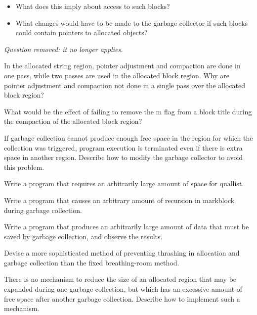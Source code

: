 \begin{itemize}
\item What does this imply about access to such blocks?

\item What changes would have to be made to the garbage collector if
such blocks could contain pointers to allocated objects?

\end{itemize}

{\em Question removed: it no longer applies.}

 In the allocated string region, pointer
adjustment and compaction are done in one pass, while two passes are
used in the allocated block region. Why are pointer adjustment and
compaction not done in a single pass over the allocated block region?

 What would be the effect of failing to remove
the m flag from a block title during the compaction of the allocated
block region?

 If garbage collection cannot produce enough free
space in the region for which the collection was triggered, program
execution is terminated even if there is extra space in another
region. Describe how to modify the garbage collector to avoid this
problem.

 Write a program that requires an arbitrarily
large amount of space for quallist.

 Write a program that causes an arbitrary amount
of recursion in markblock during garbage collection.

 Write a program that produces an arbitrarily
large amount of data that must be saved by garbage collection, and
observe the results.

 Devise a more sophisticated method of preventing
thrashing in allocation and garbage collection than the fixed
breathing-room method.

 There is no mechanism to reduce the size of an
allocated region that may be expanded during one garbage collection,
but which has an excessive amount of free space after another garbage
collection. Describe how to implement such a mechanism.

